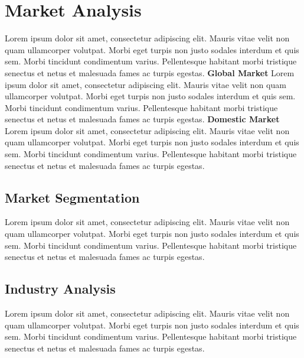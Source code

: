 \documentclass[11pt,titlepage]{article}
\begin{document}
\section{Market Analysis}
Lorem ipsum dolor sit amet, consectetur adipiscing elit. Mauris vitae velit 
non quam ullamcorper volutpat. Morbi eget turpis non justo sodales interdum 
et quis sem. Morbi tincidunt condimentum varius. Pellentesque habitant morbi 
tristique senectus et netus et malesuada fames ac turpis egestas.\newline
\textbf{Global Market}\newline
Lorem ipsum dolor sit amet, consectetur adipiscing elit. Mauris vitae velit 
non quam ullamcorper volutpat. Morbi eget turpis non justo sodales interdum 
et quis sem. Morbi tincidunt condimentum varius. Pellentesque habitant morbi 
tristique senectus et netus et malesuada fames ac turpis egestas.\newline
\textbf{Domestic Market}\newline
Lorem ipsum dolor sit amet, consectetur adipiscing elit. Mauris vitae velit 
non quam ullamcorper volutpat. Morbi eget turpis non justo sodales interdum 
et quis sem. Morbi tincidunt condimentum varius. Pellentesque habitant morbi 
tristique senectus et netus et malesuada fames ac turpis egestas.\newline

\subsection{Market Segmentation}
Lorem ipsum dolor sit amet, consectetur adipiscing elit. Mauris vitae velit 
non quam ullamcorper volutpat. Morbi eget turpis non justo sodales interdum 
et quis sem. Morbi tincidunt condimentum varius. Pellentesque habitant morbi 
tristique senectus et netus et malesuada fames ac turpis egestas.\newline

\subsection{Industry Analysis}
Lorem ipsum dolor sit amet, consectetur adipiscing elit. Mauris vitae velit 
non quam ullamcorper volutpat. Morbi eget turpis non justo sodales interdum 
et quis sem. Morbi tincidunt condimentum varius. Pellentesque habitant morbi 
tristique senectus et netus et malesuada fames ac turpis egestas.\newline
\hypertarget{competition_and_buying_patterns}{}
\end{document}
